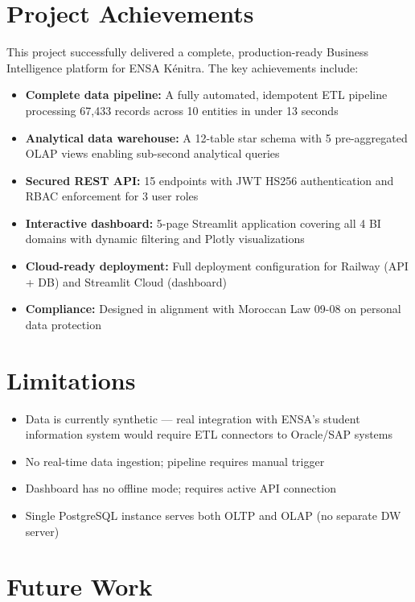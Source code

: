 \documentclass[12pt, a4paper]{report}
\begin{document}
\section{Project Achievements}

This project successfully delivered a complete, production-ready Business Intelligence platform for ENSA Kénitra. The key achievements include:

\begin{itemize}
  \item \textbf{Complete data pipeline:} A fully automated, idempotent ETL pipeline processing 67,433 records across 10 entities in under 13 seconds
  \item \textbf{Analytical data warehouse:} A 12-table star schema with 5 pre-aggregated OLAP views enabling sub-second analytical queries
  \item \textbf{Secured REST API:} 15 endpoints with JWT HS256 authentication and RBAC enforcement for 3 user roles
  \item \textbf{Interactive dashboard:} 5-page Streamlit application covering all 4 BI domains with dynamic filtering and Plotly visualizations
  \item \textbf{Cloud-ready deployment:} Full deployment configuration for Railway (API + DB) and Streamlit Cloud (dashboard)
  \item \textbf{Compliance:} Designed in alignment with Moroccan Law 09-08 on personal data protection
\end{itemize}

\section{Limitations}

\begin{itemize}
  \item Data is currently synthetic — real integration with ENSA's student information system would require ETL connectors to Oracle/SAP systems
  \item No real-time data ingestion; pipeline requires manual trigger
  \item Dashboard has no offline mode; requires active API connection
  \item Single PostgreSQL instance serves both OLTP and OLAP (no separate DW server)
\end{itemize}

\section{Future Work}
\end{document}
